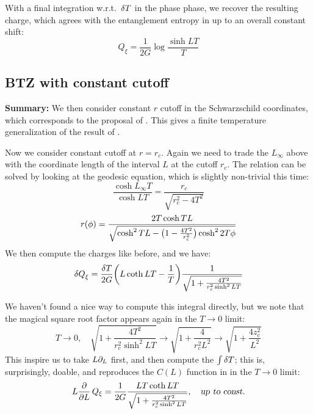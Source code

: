 \documentclass[11pt,a4paper]{article}
\begin{document}
	
	With a final integration w.r.t.~$\var{T}$ in the phase phase, we recover the resulting charge, which agrees with the entanglement entropy in \cite{Rangamani:2016dms} up to an overall constant shift:
	\begin{equation}
		Q_\xi = \frac{1}{2G} \log \frac{\sinh LT}{T}
	\end{equation}
	
\pagebreak
\subsection{BTZ with constant cutoff}
\textbf{Summary:} We then consider constant $r$ cutoff in the Schwarzschild coordinates, which corresponds to the proposal of \cite{McGough:2016lol}. This gives a finite temperature generalization of the result of \cite{Lewkowycz:2019xse}. 

	Now we consider constant cutoff at $r = r_c$. Again we need to trade the $L_\infty$ above with the coordinate length of the interval $L$ at the cutoff $r_c$. The relation can be solved by looking at the geodesic equation, which is slightly non-trivial this time:
	\begin{equation}
		\frac{\cosh L_\infty T}{\cosh LT}
		= \frac{r_c}{\sqrt{r_c^2 - 4T^2}}
	\end{equation}
	\begin{equation}
		r(\phi) = \frac{2T\cosh TL}{
				\sqrt{\cosh^2 TL - \pqty\big{
					1 - \frac{4T^2}{r_c^2}
				}\cosh^2 2T\phi}
			}
	\end{equation}
	We then compute the charges like before, and we have:
	\begin{equation}
		\var{Q}_\xi
		= \frac{\var{T}}{2G} \pqty{
				L \coth LT - \frac{1}{T}
			}
			\frac{1}{\sqrt{
				1 + \frac{4T^2}{r_c^2 \sinh^2 LT}
			}}
	\end{equation}
	
	We haven't found a nice way to compute this integral directly, but we note that the magical square root factor appears again in the $T\to 0$ limit:
	\begin{equation}
		T\to 0,
	\quad
		\sqrt{
			1 + \frac{4T^2}{r_c^2 \sinh^2 LT}
		}
		\to \sqrt{
			1 + \frac{4}{r_c^2 L^2}
		}
		\to \sqrt{
			1 + \frac{4z_c^2}{L^2}
		}
	\end{equation}
	This inspire us to take $L\partial_{L}$ first, and then compute the $\int \var{T}$; this is, surprisingly, doable, and reproduces the $C(L)$ function in \textcite{Lewkowycz:2019xse} in the $T \to 0$ limit:
	\begin{equation}
		L \pdv{L}\,Q_\xi
		= \frac{1}{2G}
			\frac{LT \coth LT}{\sqrt{
				1 + \frac{4T^2}{r_c^2 \sinh^2 LT}
			}},
	\quad\textsl{up to const.}
	\end{equation}
	
\end{document}
